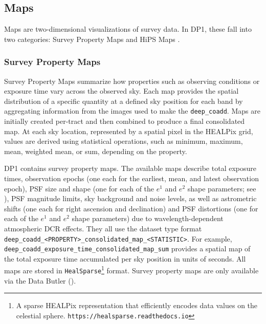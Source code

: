 \subsection{Maps}
Maps are two-dimensional visualizations of survey data.
In \gls{DP1}, these fall into two categories: Survey Property Maps and \gls{HiPS} Maps \citep{2015A&A...578A.114F}.

\subsubsection{Survey Property Maps}
\label{ssec:survey_property_maps}
Survey Property Maps \citep{10.71929/rubin/2570315} summarize how properties such as observing conditions or exposure time vary across the observed sky.
Each map provides the spatial distribution of a specific quantity at a defined sky position for each band by aggregating information from the images used to make the \texttt{deep\_coadd}.
Maps are initially created per-\gls{tract} and then combined to produce a final consolidated map.
At each sky location, represented by a spatial pixel in the \gls{HEALPix}\citep{2005ApJ...622..759G} grid, values are derived using statistical operations, such as minimum, maximum, mean, weighted mean, or sum, depending on the property.

\gls{DP1} contains \nsurveypropertymaps survey property maps.
The available maps describe total exposure times, observation epochs (one each for the earliest, mean, and latest observation epoch), \gls{PSF} size and \gls{shape} (one for each of the $e^1$ and $e^2$ shape parameters; see ), \gls{PSF} magnitude limits, sky \gls{background} and noise levels, as well as astrometric shifts (one each for right ascension and declination) and \gls{PSF} distortions (one for each of the $e^1$ and $e^2$ shape parameters) due to wavelength-dependent atmospheric \gls{DCR} effects.
They all use the dataset type  format \texttt{deep\_coadd\_<PROPERTY>\_consolidated\_map\_<STATISTIC>}.
For example, \texttt{deep\_coadd\_exposure\_time\_consolidated\_map\_sum} provides a spatial map of the total exposure time accumulated per
sky position in units of seconds.
All maps are stored in \texttt{HealSparse}\footnote{A sparse \gls{HEALPix} representation that efficiently encodes data values on the celestial sphere. \nolinkurl{https://healsparse.readthedocs.io}} format.
Survey property maps are only available via the Data \gls{Butler} ().

